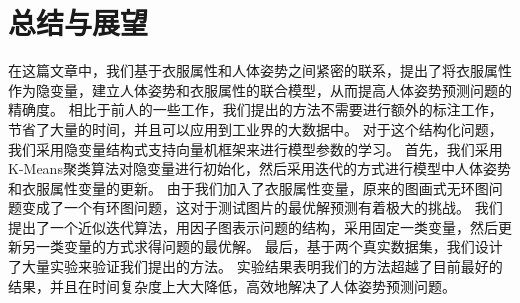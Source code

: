 
\chapter{总结与展望}
在这篇文章中，我们基于衣服属性和人体姿势之间紧密的联系，提出了将衣服属性作为隐变量，建立人体姿势和衣服属性的联合模型，从而提高人体姿势预测问题的精确度。
相比于前人的一些工作，我们提出的方法不需要进行额外的标注工作，节省了大量的时间，并且可以应用到工业界的大数据中。
对于这个结构化问题，我们采用隐变量结构式支持向量机框架来进行模型参数的学习。
首先，我们采用K-Means聚类算法对隐变量进行初始化，然后采用迭代的方式进行模型中人体姿势和衣服属性变量的更新。
由于我们加入了衣服属性变量，原来的图画式无环图问题变成了一个有环图问题，这对于测试图片的最优解预测有着极大的挑战。
我们提出了一个近似迭代算法，用因子图表示问题的结构，采用固定一类变量，然后更新另一类变量的方式求得问题的最优解。
最后，基于两个真实数据集，我们设计了大量实验来验证我们提出的方法。
实验结果表明我们的方法超越了目前最好的结果，并且在时间复杂度上大大降低，高效地解决了人体姿势预测问题。

